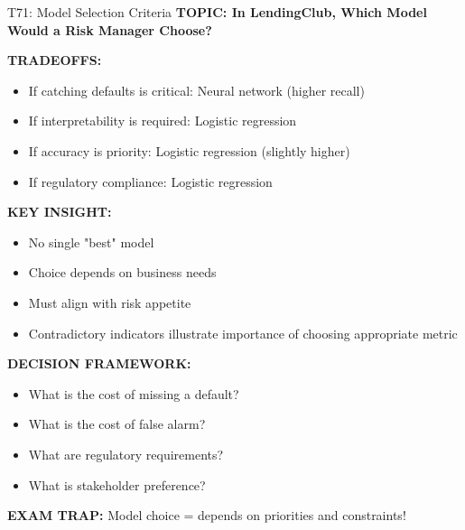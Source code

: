 \documentclass[8pt]{beamer}
\begin{document}
	\begin{frame}{T71: Model Selection Criteria}
		\fontsize{6.5}{7.5}\selectfont
		\textbf{TOPIC: In LendingClub, Which Model Would a Risk Manager Choose?}
		
		\vspace{0.1cm}
		\textbf{TRADEOFFS:}
		\begin{itemize}
			\item \textcolor{myblue}{If catching defaults is critical:} Neural network (higher recall)
			\item \textcolor{myblue}{If interpretability is required:} Logistic regression
			\item \textcolor{myblue}{If accuracy is priority:} Logistic regression (slightly higher)
			\item \textcolor{myblue}{If regulatory compliance:} Logistic regression
		\end{itemize}
		
		\vspace{0.1cm}
		\textbf{KEY INSIGHT:}
		\begin{itemize}
			\item No single "best" model
			\item Choice depends on business needs
			\item Must align with risk appetite
			\item Contradictory indicators illustrate importance of choosing appropriate metric
		\end{itemize}
		
		\vspace{0.1cm}
		\textbf{DECISION FRAMEWORK:}
		\begin{itemize}
			\item What is the cost of missing a default?
			\item What is the cost of false alarm?
			\item What are regulatory requirements?
			\item What is stakeholder preference?
		\end{itemize}
		
		\textcolor{myred}{\textbf{EXAM TRAP:}} Model choice = \textcolor{myblue}{depends on priorities and constraints}!
	\end{frame}
	
\end{document}
